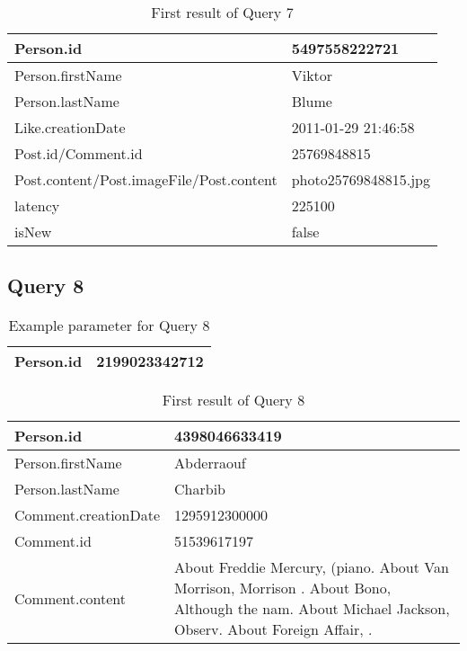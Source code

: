 \begin{table}[H]
    \begin{tabular}{|p{8cm}|p{8cm}|}
        \hline
        Person.id & 5497558222721  \\
        \hline
        Person.firstName &  Viktor \\
        \hline
        Person.lastName &  Blume \\
        \hline
        Like.creationDate & 2011-01-29 21:46:58 \\
        \hline
        Post.id/Comment.id & 25769848815 \\
        \hline
        Post.content/Post.imageFile/Post.content & photo25769848815.jpg \\
        \hline
        latency & 225100 \\
        \hline
        isNew & false \\
        \hline
    \end{tabular}
    \caption{First result of Query 7}
\end{table}

\subsection{Query 8}

\begin{table}[H]
    \begin{tabular}{|l|l|}
        \hline
        Person.id & 2199023342712 \\
        \hline
    \end{tabular}
    \caption{Example parameter for Query 8}
\end{table}

\begin{table}[H]
    \begin{tabular}{|p{8cm}|p{8cm}|}
        \hline
        Person.id & 4398046633419 \\
        \hline
        Person.firstName & Abderraouf  \\
        \hline
        Person.lastName & Charbib  \\
        \hline
        Comment.creationDate & 1295912300000 \\
        \hline
        Comment.id & 51539617197 \\
        \hline
        Comment.content & About Freddie Mercury, (piano. About Van Morrison, Morrison . About Bono, Although the nam. About Michael Jackson, Observ. About Foreign Affair, . \\
        \hline
    \end{tabular}
    \caption{First result of Query 8}
\end{table}


